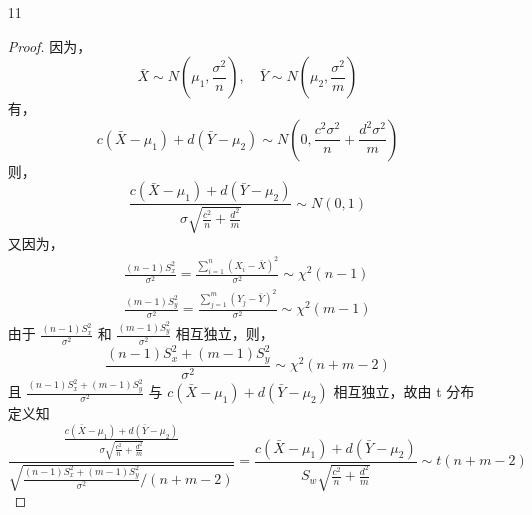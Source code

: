 \documentclass[normal,cn]{elegantnote}
\begin{document}
\begin{enumerate}
\begin{proof}
            所以，由性质 3.4.13 有，对于二维正态分布 $(X_{1}+X_{2},X_{1}-X_{2})$，不相关与独立是等价的。

            于是，根据 F 分布的定义有
            \begin{equation*}
                Y=\left(\frac{X_{1}+X_{2}}{X_{1}-X_{2}}\right)^{2}=\frac{\frac{\left(X_{1}+X_{2}\right)^{2}}{2\sigma^{2}}}{\frac{\left(X_{1}-X_{2}\right)^{2}}{2\sigma^{2}}}\sim F(1,1)
            \end{equation*}
        \end{proof}
    \item[11]
        \begin{proof}
            因为，
            \begin{equation*}
                \bar{X}\sim N\left(\mu_{1},\frac{\sigma^{2}}{n}\right),\quad\bar{Y}\sim N\left(\mu_{2},\frac{\sigma^{2}}{m}\right)
            \end{equation*}
            有，
            \begin{equation*}
                c\left(\bar{X}-\mu_{1}\right)+d\left(\bar{Y}-\mu_{2}\right)\sim N\left(0,\frac{c^{2}\sigma^{2}}{n}+\frac{d^{2}\sigma^{2}}{m}\right)
            \end{equation*}
            则，
            \begin{equation*}
                \frac{c\left(\bar{X}-\mu_{1}\right)+d\left(\bar{Y}-\mu_{2}\right)}{\sigma\sqrt{\frac{c^{2}}{n}+\frac{d^{2}}{m}}}\sim N(0,1)
            \end{equation*}
            又因为，
            \begin{gather*}
                \frac{(n-1)S_{x}^{2}}{\sigma^{2}}=\frac{\sum_{i=1}^{n}\left(X_{i}-\bar{X}\right)^{2}}{\sigma^{2}}\sim\chi^{2}(n-1) \\
                \frac{(m-1)S_{y}^{2}}{\sigma^{2}}=\frac{\sum_{j=1}^{m}\left(Y_{j}-\bar{Y}\right)^{2}}{\sigma^{2}}\sim\chi^{2}(m-1)
            \end{gather*}
            由于 $\frac{(n-1)S_{x}^{2}}{\sigma^{2}}$ 和 $\frac{(m-1)S_{y}^{2}}{\sigma^{2}}$ 相互独立，则，
            \begin{equation*}
                \frac{(n-1)S_{x}^{2}+(m-1)S_{y}^{2}}{\sigma^{2}}\sim\chi^{2}(n+m-2)
            \end{equation*}
            且 $\frac{(n-1)S_{x}^{2}+(m-1)S_{y}^{2}}{\sigma^{2}}$ 与 $c\left(\bar{X}-\mu_{1}\right)+d\left(\bar{Y}-\mu_{2}\right)$ 相互独立，故由 t 分布定义知
            \begin{equation*}
                \frac{\frac{c\left(\bar{X}-\mu_{1}\right)+d\left(\bar{Y}-\mu_{2}\right)}{\sigma\sqrt{\frac{c^{2}}{n}+\frac{d^{2}}{m}}}}{\sqrt{\frac{(n-1)S_{x}^{2}+(m-1)S_{y}^{2}}{\sigma^{2}}/(n+m-2)}}=\frac{c\left(\bar{X}-\mu_{1}\right)+d\left(\bar{Y}-\mu_{2}\right)}{S_{w}\sqrt{\frac{c^{2}}{n}+\frac{d^{2}}{m}}}\sim t(n+m-2)

\end{equation*}
\end{proof}
\end{enumerate}
\end{document}
